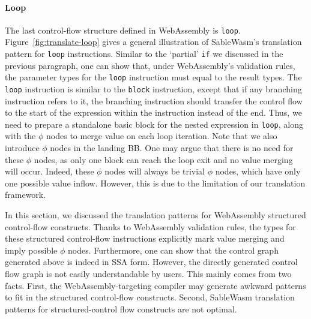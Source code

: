 \paragraph{Loop}
The last control-flow structure defined in WebAssembly is \texttt{loop}.
Figure~\ref{fig:translate-loop} gives a general illustration of SableWasm's
translation pattern for \texttt{loop} instructions. Similar to the `partial'
\texttt{if} we discussed in the previous paragraph, one can show that, under
WebAssembly's validation rules, the parameter types for the \texttt{loop}
instruction must equal to the result types. The \texttt{loop} instruction is
similar to the \texttt{block} instruction, except that if any branching
instruction refers to it, the branching instruction should transfer the control
flow to the start of the expression within the instruction instead of the end.
Thus, we need to prepare a standalone basic block for the nested expression in
\texttt{loop}, along with the $\phi$ nodes to merge value on each loop
iteration. Note that we also introduce $\phi$ nodes in the landing BB. One may
argue that there is no need for these $\phi$ nodes, as only one block can reach
the loop exit and no value merging will occur. Indeed, these $\phi$ nodes will
always be trivial $\phi$ nodes, which have only one possible value inflow.
However, this is due to the limitation of our translation framework.

In this section, we discussed the translation patterns for WebAssembly
structured control-flow constructs. Thanks to WebAssembly validation rules, the
types for these structured control-flow instructions explicitly mark value
merging and imply possible $\phi$ nodes. Furthermore, one can show that the
control graph generated above is indeed in SSA form. However, the directly
generated control flow graph is not easily understandable by users. This mainly
comes from two facts. First, the WebAssembly-targeting compiler may generate
awkward patterns to fit in the structured control-flow constructs. Second,
SableWasm translation patterns for structured-control flow constructs are not
optimal.